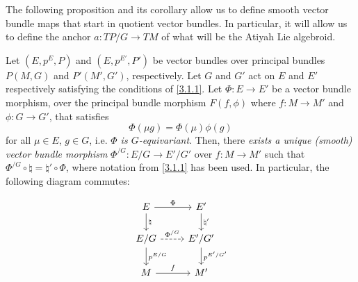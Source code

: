 The following proposition and its corollary allow us to define smooth vector bundle maps that start in quotient vector bundles. In particular, it will allow us to define the anchor $a:TP/G \to TM$ of what will be the Atiyah Lie algebroid.

\begin{proposition} \label{3.1.2}
Let $(E, p^E, P)$ and $(E, p^{E'}, P')$ be vector bundles over principal bundles $P(M, G)$ and $P'(M', G')$, respectively. Let $G$ and $G'$ act on $E$ and $E'$ respectively satisfying the conditions of \ref{3.1.1}. Let $\Phi: E \to E'$ be a vector bundle morphism, over the principal bundle morphism $F(f, \phi)$ where $f:M\to M'$ and $\phi:G \to G'$, that satisfies \[\Phi(\mu g) = \Phi(\mu) \phi(g)\] for all $\mu \in E$, $g \in G$, i.e. \emph{$\Phi$ is $G$-equivariant}. Then, there \emph{exists a unique (smooth) vector bundle morphism} $\Phi^{/G}: E/G \to E'/G'$ over $f: M \to M'$ such that $\Phi^{/G} \circ \natural = \natural' \circ \Phi$, where notation from \ref{3.1.1} has been used. In particular, the following diagram commutes:

\begin{equation} \label{diagramQuotientMorph}
\begin{tikzcd}
    E   \ar{r}{\Phi}     \ar{d}{\natural} &   E'  \ar{d}{\natural'} \\
    E/G \ar[dashed]{r}{\Phi^{/G}} \ar{d}{p^{E/G}}  & E'/G' \ar{d}{p^{E'/G'}} \\
    M \ar{r}{f} & M'
\end{tikzcd}
\end{equation}
\end{proposition}

